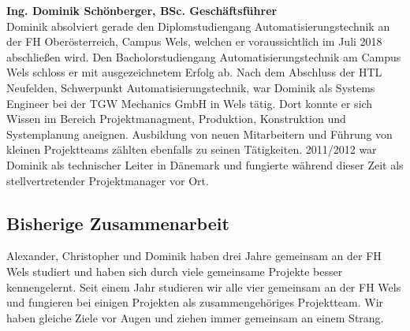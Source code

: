 \textbf{Ing. Dominik Schönberger, BSc. Geschäftsführer} \\
Dominik absolviert gerade den Diplomstudiengang Automatisierungstechnik an der FH Oberösterreich, Campus Wels, welchen er voraussichtlich im Juli 2018 abschließen wird. Den Bacholorstudiengang Automatisierungstechnik am Campus Wels schloss er mit ausgezeichnetem Erfolg ab.  Nach dem Abschluss der HTL Neufelden, Schwerpunkt Automatisierungstechnik, war Dominik als Systems Engineer bei der TGW Mechanics GmbH in Wels tätig. Dort konnte er sich Wissen im Bereich Projektmanagment, Produktion, Konstruktion und Systemplanung aneignen. Ausbildung von neuen Mitarbeitern und Führung von kleinen Projektteams zählten ebenfalls zu seinen Tätigkeiten. 2011/2012 war Dominik als technischer Leiter in Dänemark und fungierte während dieser Zeit als stellvertretender Projektmanager vor Ort.\\

\subsection{Bisherige Zusammenarbeit}
Alexander, Christopher und Dominik haben drei Jahre gemeinsam an der FH Wels studiert und haben sich durch viele gemeinsame Projekte besser kennengelernt. Seit einem Jahr studieren wir alle vier gemeinsam an der FH Wels und fungieren bei einigen Projekten als zusammengehöriges Projektteam. Wir haben gleiche Ziele vor Augen und ziehen immer gemeinsam an einem Strang. 


